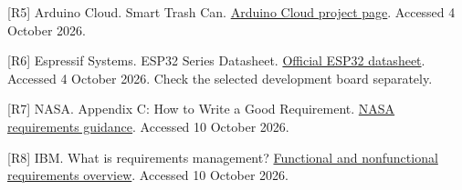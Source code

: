 \documentclass[11pt,a4paper]{article}
\begin{document}
[R5] Arduino Cloud. Smart Trash Can. \href{https://cloud.arduino.cc/use-cases-home-automation-smart-trash-can/}{Arduino Cloud project page}. Accessed 4 October 2026.\par

[R6] Espressif Systems. ESP32 Series Datasheet. \href{https://documentation.espressif.com/esp32_datasheet_en.html}{Official ESP32 datasheet}. Accessed 4 October 2026. Check the selected development board separately.\par


[R7] NASA. Appendix C: How to Write a Good Requirement. \href{https://www.nasa.gov/reference/appendix-c-how-to-write-a-good-requirement/}{NASA requirements guidance}. Accessed 10 October 2026.\par

[R8] IBM. What is requirements management? \href{https://www.ibm.com/think/topics/what-is-requirements-management}{Functional and nonfunctional requirements overview}. Accessed 10 October 2026.\par
\end{document}
